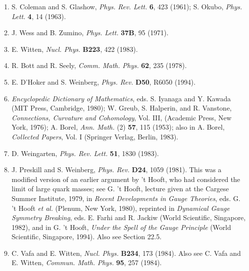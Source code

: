 \begin{enumerate}
\item {}\label{ch19-ref-41}
S. Coleman and S. Glashow, \emph{Phys. Rev. Lett.} \textbf{6}, 423 (1961); S. Okubo, \emph{Phys. Lett.} \textbf{4}, 14 (1963).

\item {}\label{ch19-ref-42}
J. Wess and B. Zumino, \emph{Phys. Lett.} \textbf{37B}, 95 (1971).

\item {}\label{ch19-ref-43}
E. Witten, \emph{Nucl. Phys.} \textbf{B223}, 422 (1983).

\item {}\label{ch19-ref-44}
R. Bott and R. Seely, \emph{Comm. Math. Phys.} \textbf{62}, 235 (1978).

\item {}\label{ch19-ref-45}
E. D'Hoker and S. Weinberg, \emph{Phys. Rev.} \textbf{D50}, R6050 (1994).

\item {}\label{ch19-ref-46}
\emph{Encyclopedic Dictionary of Mathematics}, eds. S. Iyanaga and Y. Kawada (MIT Press, Cambridge, 1980); W. Greub, S. Halperin, and R. Vanstone, \emph{Connections, Curvature and Cohomology}, Vol. III, (Academic Press, New York, 1976); A. Borel, \emph{Ann. Math.} (2) \textbf{57}, 115 (1953); also in A. Borel, \emph{Collected Papers}, Vol. I (Springer Verlag, Berlin, 1983).

\item {}\label{ch19-ref-47}
D. Weingarten, \emph{Phys. Rev. Lett.} \textbf{51}, 1830 (1983).

\item {}\label{ch19-ref-48}
J. Preskill and S. Weinberg, \emph{Phys. Rev.} \textbf{D24}, 1059 (1981). This was a modified version of an earlier argument by 't Hooft, who had considered the limit of large quark masses; see G. 't Hooft, lecture given at the Cargese Summer Institute, 1979, in \emph{Recent Developments in Gauge Theories}, eds. G. 't Hooft \emph{et al.} (Plenum, New York, 1980), reprinted in \emph{Dynamical Gauge Symmetry Breaking}, eds. E. Farhi and R. Jackiw (World Scientific, Singapore, 1982), and in G. 't Hooft, \emph{Under the Spell of the Gauge Principle} (World Scientific, Singapore, 1994). Also see Section 22.5.

\item {}\label{ch19-ref-49}
C. Vafa and E. Witten, \emph{Nucl. Phys.} \textbf{B234}, 173 (1984). Also see C. Vafa and E. Witten, \emph{Commun. Math. Phys.} \textbf{95}, 257 (1984).


\end{enumerate}
